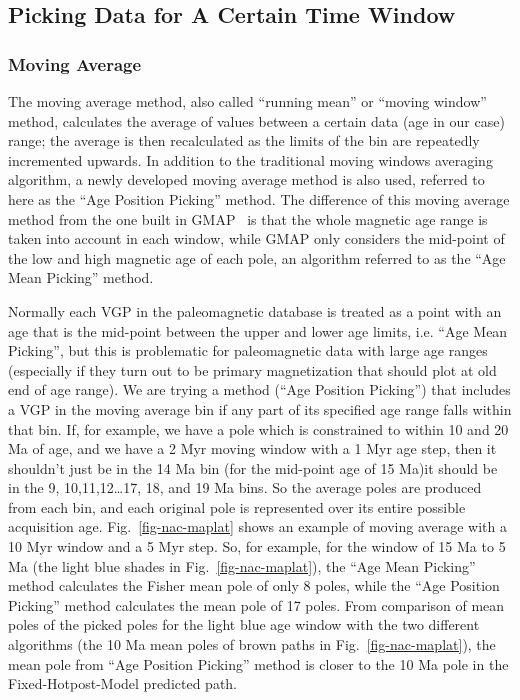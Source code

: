 \subsection{Picking Data for A Certain Time Window}

\subsubsection{Moving Average}

The moving average method, also called ``running mean'' or ``moving
window''~\cite{T08} method, calculates the average of values between a certain
data (age in our case) range; the average is then recalculated as the limits of
the bin are repeatedly incremented upwards. In addition to the traditional
moving windows averaging algorithm, a newly developed moving average method is
also used, referred to here as the ``Age Position Picking'' method. The
difference of this moving average method from the one built in
GMAP~\cite{T99,T08} is that the whole magnetic age range is taken into account
in each window, while GMAP only considers the mid-point of the low and high
magnetic age of each pole, an algorithm referred to as the ``Age Mean Picking''
method.

Normally each VGP in the paleomagnetic database is treated as a point with an
age that is the mid-point between the upper and lower age limits, i.e. ``Age
Mean Picking'', but this is problematic for paleomagnetic data with large age
ranges (especially if they turn out to be primary magnetization that should
plot at old end of age range). We are trying a method (``Age Position Picking'')
that includes a VGP in the moving average bin if any part of its specified age
range falls within that bin. If, for example, we have a pole which is
constrained to within 10 and 20 Ma of age, and we have a 2 Myr moving window
with a 1 Myr age step, then it shouldn't just be in the 14 Ma bin
(for the mid-point age of 15 Ma)\textemdash{}it should be in the 9,
10,11,12\ldots17,
18, and 19 Ma bins. So the average poles are produced
from each bin, and each original pole is represented over its entire possible
acquisition age. Fig.~\ref{fig-nac-maplat} shows an example of moving average
with a 10 Myr window and a 5 Myr step. So, for example, for the window of 15 Ma
to 5 Ma (the light blue shades in Fig.~\ref{fig-nac-maplat}), the ``Age Mean
Picking'' method calculates the Fisher mean pole of only 8 poles, while the
``Age Position Picking'' method calculates the mean pole of 17 poles. From
comparison of mean poles of the picked poles for the light blue age window with
the two different algorithms (the 10 Ma mean poles of brown paths in
Fig.~\ref{fig-nac-maplat}), the mean pole from ``Age Position Picking'' method
is closer to the 10 Ma pole in the Fixed-Hotpost-Model predicted path.

